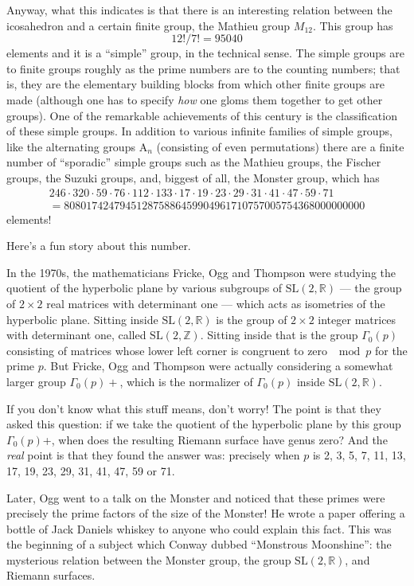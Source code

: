 \documentclass[12pt]{article}
\begin{document}
Anyway, what this indicates is that there is an interesting relation
between the icosahedron and a certain finite group, the Mathieu group
\(M_{12}\). This group has \[12!/7! = 95040\] elements and it is a
``simple'' group, in the technical sense. The simple groups are to
finite groups roughly as the prime numbers are to the counting numbers;
that is, they are the elementary building blocks from which other finite
groups are made (although one has to specify \emph{how} one gloms them
together to get other groups). One of the remarkable achievements of
this century is the classification of these simple groups. In addition
to various infinite families of simple groups, like the alternating
groups \(\mathrm{A}_n\) (consisting of even permutations) there are a
finite number of ``sporadic'' simple groups such as the Mathieu groups,
the Fischer groups, the Suzuki groups, and, biggest of all, the Monster
group, which has
\[\begin{gathered}246\cdot320\cdot59\cdot76\cdot112\cdot133\cdot17\cdot19\cdot23\cdot29\cdot31\cdot41\cdot47\cdot59\cdot71 \\= 808017424794512875886459904961710757005754368000000000\end{gathered}\]
elements!

Here's a fun story about this number.

In the 1970s, the mathematicians Fricke, Ogg and Thompson were studying
the quotient of the hyperbolic plane by various subgroups of
\(\mathrm{SL}(2,\mathbb{R})\) --- the group of \(2\times2\) real
matrices with determinant one --- which acts as isometries of the
hyperbolic plane. Sitting inside \(\mathrm{SL}(2,\mathbb{R})\) is the
group of \(2\times2\) integer matrices with determinant one, called
\(\mathrm{SL}(2,\mathbb{Z})\). Sitting inside that is the group
\(\Gamma_0(p)\) consisting of matrices whose lower left corner is
congruent to zero \(\mod p\) for the prime \(p\). But Fricke, Ogg and
Thompson were actually considering a somewhat larger group
\(\Gamma_0(p)+\), which is the normalizer of \(\Gamma_0(p)\) inside
\(\mathrm{SL}(2,\mathbb{R})\).

If you don't know what this stuff means, don't worry! The point is that
they asked this question: if we take the quotient of the hyperbolic
plane by this group \(\Gamma_0(p)\)+, when does the resulting Riemann
surface have genus zero? And the \emph{real} point is that they found
the answer was: precisely when \(p\) is 2, 3, 5, 7, 11, 13, 17, 19, 23,
29, 31, 41, 47, 59 or 71.

Later, Ogg went to a talk on the Monster and noticed that these primes
were precisely the prime factors of the size of the Monster! He wrote a
paper offering a bottle of Jack Daniels whiskey to anyone who could
explain this fact. This was the beginning of a subject which Conway
dubbed ``Monstrous Moonshine'': the mysterious relation between the
Monster group, the group \(\mathrm{SL}(2,\mathbb{R})\), and Riemann
surfaces.
\end{document}
